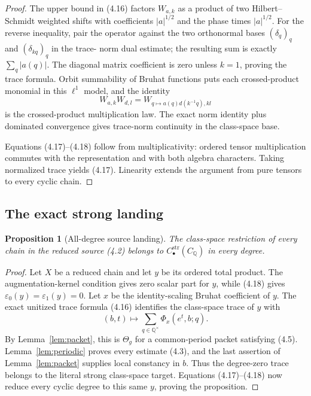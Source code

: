 \documentclass[11pt,reqno]{amsart}
\newtheorem{proposition}[theorem]{Proposition}
\newcommand{\Q}{\mathbb Q}
\newcommand{\eps}{\varepsilon}
\begin{document}
\begin{proof}
The upper bound in (4.16) factors $W_{a,k}$ as a product of two Hilbert--Schmidt weighted shifts
with coefficients $|a|^{1/2}$ and the phase times $|a|^{1/2}$.  For the reverse inequality, pair
the operator against the two orthonormal bases $(\delta_q)_q$ and $(\delta_{kq})_q$ in the trace-
norm dual estimate; the resulting sum is exactly $\sum_q|a(q)|$.  The diagonal matrix coefficient
is zero unless $k=1$, proving the trace formula.  Orbit summability of Bruhat functions puts each
crossed-product monomial in this $\ell^1$ model, and the identity
\[
 W_{a,k}W_{d,l}=W_{q\mapsto a(q)d(k^{-1}q),kl}        \tag{4.19}
\]
is the crossed-product multiplication law.  The exact norm identity plus dominated convergence
gives trace-norm continuity in the class-space base.

Equations (4.17)--(4.18) follow from multiplicativity: ordered tensor multiplication commutes with
the representation and with both algebra characters.  Taking normalized trace yields (4.17).
Linearity extends the argument from pure tensors to every cyclic chain.
\end{proof}

\subsection{The exact strong landing}

\begin{proposition}[All-degree source landing]\label{prop:landing}
The class-space restriction of every chain in the reduced source \textup{(4.2)} belongs to
$C_\bullet^{\mathrm{str}}(C_\Q)$ in every degree.
\end{proposition}

\begin{proof}
Let $X$ be a reduced chain and let $y$ be its ordered total product.  The augmentation-kernel
condition gives zero scalar part for $y$, while (4.18) gives
$\eps_0(y)=\eps_1(y)=0$.  Let $x$ be the identity-scaling Bruhat coefficient of $y$.  The exact
unitized trace formula (4.16) identifies the class-space trace of $y$ with
\[
              (b,t)\longmapsto
              \sum_{q\in\Q^\times}\Phi_x(e^t,b;q).   \tag{4.20}
\]
By Lemma~\ref{lem:packet}, this is $\Theta_g$ for a common-period packet satisfying (4.5).
Lemma~\ref{lem:periodic} proves every estimate (4.3), and the last assertion of
Lemma~\ref{lem:packet} supplies local constancy in $b$.  Thus the degree-zero trace belongs to the
literal strong class-space target.  Equations (4.17)--(4.18) now reduce every cyclic degree to this
same $y$, proving the proposition.
\end{proof}
\end{document}
